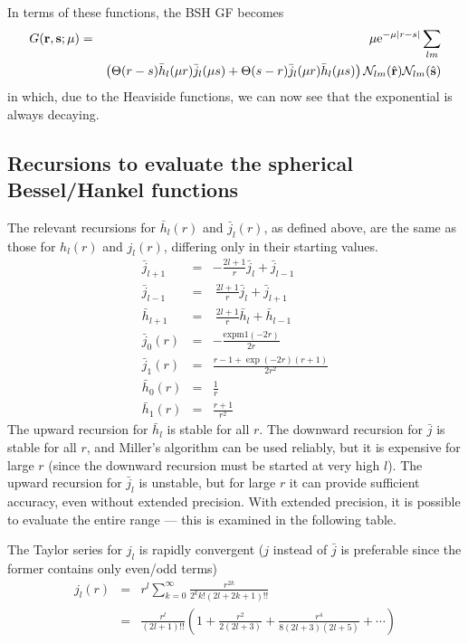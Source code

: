 \documentclass[12pt]{article}
\newcommand{\N}{\mathcal{N}}
\newcommand{\rv}{\vb{r}}
\newcommand{\sv}{\vb{s}}
\newcommand{\rhat}{\hat{\rv}}
\newcommand{\shat}{\hat{\sv}}
\begin{document}
In terms of these functions, the BSH GF becomes
\begin{eqnarray}
  G(\rv,\sv; \mu) & = & \mu {\mathrm e}^{-\mu |r-s|}
  \sum_{lm} \\
  & & 
  \left(    
  \Theta(r-s) \bar{h}_l(\mu r) \bar{j}_l(\mu s)
  +
  \Theta(s-r) \bar{j}_l(\mu r) \bar{h}_l(\mu s)
  \right)
  \N_{lm}(\rhat) \N_{lm}(\shat)
\end{eqnarray}
in which, due to the Heaviside functions, we can now see that the exponential is always decaying.

\subsection{Recursions to evaluate the spherical Bessel/Hankel functions}

The relevant recursions for $\bar{h}_l(r)$ and $\bar{j}_l(r)$, as defined above, are the same as those for $h_l(r)$ and $j_l(r)$, differing only in their starting values.
\begin{eqnarray}
  \bar{j}_{l+1} & = & -\frac{2l+1}{r} \bar{j}_l + \bar{j}_{l-1} \\
  \bar{j}_{l-1} & = & \!\ \frac{2l+1}{r} \bar{j}_l + \bar{j}_{l+1} \\
  \bar{h}_{l+1} & = & \!\ \frac{2l+1}{r} \bar{h}_l + \bar{h}_{l-1} \\
  \bar{j}_0(r) & = & -\frac{\mathrm{expm1}(-2r)}{2r} \\
  \bar{j}_1(r) & = & \frac{r-1+\exp(-2r)(r+1)}{2 r^2} \\
  \bar{h}_0(r) & = & \frac{1}{r} \\
  \bar{h}_1(r) & = & \frac{r+1}{r^2}
\end{eqnarray}
The upward recursion for $\bar{h}_l$ is stable for all $r$.  The downward recursion for $\bar{j}$ is stable for all $r$, and Miller's algorithm can be used reliably, but it is expensive for large $r$ (since the downward recursion must be started at very high $l$).  The upward recursion for $\bar{j}_l$ is unstable, but for large $r$ it can provide sufficient accuracy, even without extended precision.  With extended precision, it is possible to evaluate the entire range --- this is examined in the following table.

The Taylor series for $j_l$ is rapidly convergent ($j$ instead of $\bar{j}$ is preferable since the former contains only even/odd terms)
\begin{eqnarray}
  j_l(r) & = & r^l \sum_{k=0}^\infty \frac{r^{2k}}{2^k k! (2l+2k+1)!!} \\
  & = & \frac{r^l}{(2l+1)!!} \left(1  + \frac{r^2}{2 (2l+3)} + \frac{r^4}{8 (2l+3)(2l+5)} + \cdots \right)
\end{eqnarray}
\end{document}
